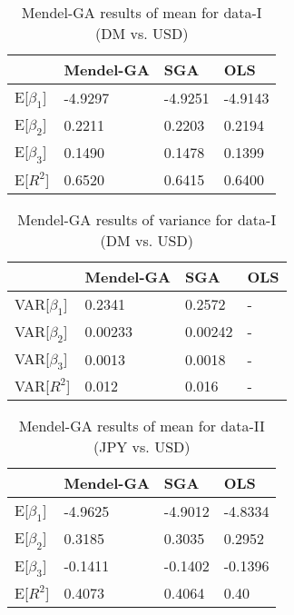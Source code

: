 \begin{table}[h!]
\caption{Mendel-GA results of mean for data-I (DM vs. USD) } %
\centering %
\begin{tabular}{llll}
\hline
            & Mendel-GA  & SGA       & OLS \\
\hline
E[$\beta_1$]   & -4.9297  & -4.9251 &  -4.9143 \\
E[$\beta_2$]   & 0.2211   & 0.2203  & 0.2194 \\
E[$\beta_3$]   & 0.1490   & 0.1478  & 0.1399 \\
E[$R^2$]       & 0.6520  & 0.6415 & 0.6400 \\
\hline
\end{tabular}
\label{tableGAresults_DM_mean} %
\end{table}

\begin{table}[h!]
\caption{ Mendel-GA results of variance for data-I (DM vs. USD) } %
\centering %
\begin{tabular}{llll}
\hline
                 & Mendel-GA    & SGA          & OLS \\
\hline
VAR[$\beta_1$]   & 0.2341       & 0.2572       & - \\
VAR[$\beta_2$]   & 0.00233      & 0.00242      & - \\
VAR[$\beta_3$]   & 0.0013       & 0.0018       & - \\
VAR[$R^2$]       & 0.012        & 0.016        & - \\
\hline
\end{tabular}
\label{tableGAresults_DM_var} %
\end{table}


\begin{table}[h!]
\caption{ Mendel-GA results of mean for data-II (JPY vs. USD)} %
\centering %
\begin{tabular}{llll}
\hline
              & Mendel-GA   & SGA     & OLS \\
\hline
E[$\beta_1$]   &  -4.9625   & -4.9012  & -4.8334 \\
E[$\beta_2$]   &  0.3185    & 0.3035   & 0.2952 \\
E[$\beta_3$]   &  -0.1411   & -0.1402  &  -0.1396\\
E[$R^2$]       &   0.4073   &  0.4064  &  0.40 \\
\hline
\end{tabular}
\label{tableGAresults_JPY_mean} %
\end{table}



